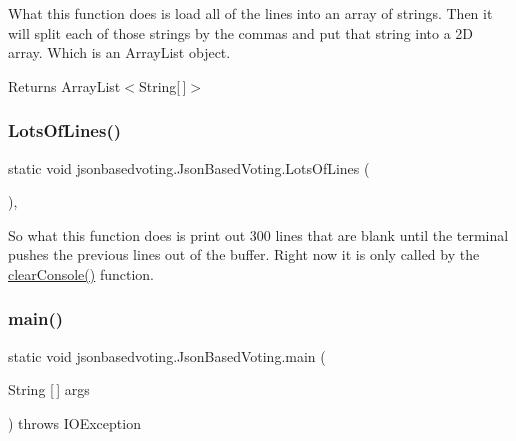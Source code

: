 What this function does is load all of the lines into an array of strings. Then it will split each of those strings by the commas and put that string into a 2D array. Which is an Array\+List object. \begin{DoxyReturn}{Returns}
Array\+List$<$\+String\mbox{[}$\,$\mbox{]}$>$ 
\end{DoxyReturn}
\mbox{\label{classjsonbasedvoting_1_1_json_based_voting_a6f3f1426563435fa14b0e1fb9cf97032}} 
\subsubsection{\texorpdfstring{LotsOfLines()}{LotsOfLines()}}
{\footnotesize\ttfamily static void jsonbasedvoting.\+Json\+Based\+Voting.\+Lots\+Of\+Lines (\begin{DoxyParamCaption}{ }\end{DoxyParamCaption})\hspace{0.3cm}{\ttfamily [static]}, {\ttfamily [package]}}

So what this function does is print out 300 lines that are blank until the terminal pushes the previous lines out of the buffer. Right now it is only called by the \mbox{\hyperlink{classjsonbasedvoting_1_1_json_based_voting_a1d797d0d870297df5f50f56ab63fb7d8}{clear\+Console()}} function. \mbox{\label{classjsonbasedvoting_1_1_json_based_voting_a39d87f4c78499d4c595529d34b656f82}} 
\subsubsection{\texorpdfstring{main()}{main()}}
{\footnotesize\ttfamily static void jsonbasedvoting.\+Json\+Based\+Voting.\+main (\begin{DoxyParamCaption}\item[{String \mbox{[}$\,$\mbox{]}}]{args }\end{DoxyParamCaption}) throws I\+O\+Exception\hspace{0.3cm}{\ttfamily [static]}}


